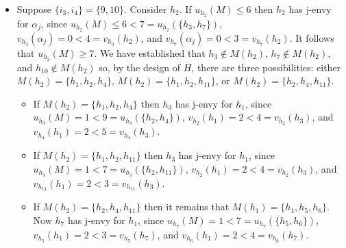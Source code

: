 \begin{itemize}
\begin{itemize}
\begin{itemize}
    \end{itemize}
    \item Suppose $\{ {i_3}, {i_4} \} = \{ 9, 10 \}$. Consider $h_2$. If $u_{h_2}(M) \leq 6$ then $h_2$ has j-envy for $\alpha_{j}$, since $u_{h_2}(M) \leq 6 < 7 = u_{h_2}(\{ h_3, h_7 \})$, $v_{h_3}(\alpha_{j}) = 0 < 4 = v_{h_3}(h_2)$, and $v_{h_7}(\alpha_{j}) = 0 < 3 = v_{h_7}(h_2)$. It follows that $u_{h_2}(M) \geq 7$. We have established that $h_3 \notin M(h_2)$, $h_7 \notin M(h_2)$, and $h_{10} \notin M(h_2)$ so, by the design of $H$, there are three possibilities: either $M(h_2) = \{ h_1, h_2, h_4 \}$, $M(h_2) = \{ h_1, h_2, h_{11} \}$, or $M(h_2) = \{ h_2, h_4, h_{11} \}$.
    \begin{itemize}
        \item If $M(h_2) = \{ h_1, h_2, h_4 \}$ then $h_3$ has j-envy for $h_1$, since $u_{h_3}(M) = 1 < 9 = u_{h_3}(\{ h_2, h_4 \})$, $v_{h_2}(h_1) = 2 < 4 = v_{h_2}(h_3)$, and $v_{h_4}(h_1) = 2 < 5 = v_{h_4}(h_3)$.
        \item If $M(h_2) = \{ h_1, h_2, h_{11} \}$ then $h_3$ has j-envy for $h_1$, since $u_{h_3}(M) = 1 < 7 = u_{h_3}(\{ h_2, h_{11} \})$, $v_{h_2}(h_1) = 2 < 4 = v_{h_2}(h_3)$, and $v_{h_{11}}(h_1) = 2 < 3 = v_{h_{11}}(h_3)$.
        \item If $M(h_2) = \{ h_2, h_4, h_{11} \}$ then it remains that $M(h_1) = \{ h_1, h_5, h_6 \}$. Now $h_7$ has j-envy for $h_1$, since $u_{h_7}(M) = 1 < 7 = u_{h_7}(\{ h_5, h_6 \})$, $v_{h_5}(h_1) = 2 < 3 = v_{h_5}(h_7)$, and $v_{h_6}(h_1) = 2 < 4 = v_{h_6}(h_7)$.
    \end{itemize}
\end{itemize}
\end{itemize}